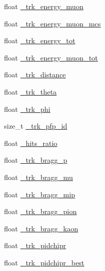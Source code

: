\begin{DoxyCompactItemize}
float \hyperlink{classselection_1_1CC0piNpSelection_aabcb2e3b6df63f077fc37d881c1794a3}{\+\_\+trk\+\_\+energy\+\_\+muon}
\item 
float \hyperlink{classselection_1_1CC0piNpSelection_a4ae8946bcc37ce152c81ba3c28d60fbb}{\+\_\+trk\+\_\+energy\+\_\+muon\+\_\+mcs}
\item 
float \hyperlink{classselection_1_1CC0piNpSelection_a8a0da0081e2f182880249debba6551e3}{\+\_\+trk\+\_\+energy\+\_\+tot}
\item 
float \hyperlink{classselection_1_1CC0piNpSelection_aebac9c09110d469f5d7ed3817c33e437}{\+\_\+trk\+\_\+energy\+\_\+muon\+\_\+tot}
\item 
float \hyperlink{classselection_1_1CC0piNpSelection_a0f16777192fbed04bcc67edfdfa67e6b}{\+\_\+trk\+\_\+distance}
\item 
float \hyperlink{classselection_1_1CC0piNpSelection_a08cd38de74e9611829a3580a310c19f2}{\+\_\+trk\+\_\+theta}
\item 
float \hyperlink{classselection_1_1CC0piNpSelection_a85a6029e249e3ff20ea6d8eaabf22142}{\+\_\+trk\+\_\+phi}
\item 
size\+\_\+t \hyperlink{classselection_1_1CC0piNpSelection_a641e7e656a28a5b31a5c8ab21dad9d3b}{\+\_\+trk\+\_\+pfp\+\_\+id}
\item 
float \hyperlink{classselection_1_1CC0piNpSelection_a32b43003c9168115bc94544049e439a2}{\+\_\+hits\+\_\+ratio}
\item 
float \hyperlink{classselection_1_1CC0piNpSelection_a52d578481ee7dd4fed45f8e3c8ed44da}{\+\_\+trk\+\_\+bragg\+\_\+p}
\item 
float \hyperlink{classselection_1_1CC0piNpSelection_a9e7b081beb0ef9129f15a7fb965276f1}{\+\_\+trk\+\_\+bragg\+\_\+mu}
\item 
float \hyperlink{classselection_1_1CC0piNpSelection_aec1e4d27216773ec40bc66ab5c217abc}{\+\_\+trk\+\_\+bragg\+\_\+mip}
\item 
float \hyperlink{classselection_1_1CC0piNpSelection_a5371981bb5f02024c2ba1d986541ffd9}{\+\_\+trk\+\_\+bragg\+\_\+pion}
\item 
float \hyperlink{classselection_1_1CC0piNpSelection_ac9b23583581239191762cfb60307fb78}{\+\_\+trk\+\_\+bragg\+\_\+kaon}
\item 
float \hyperlink{classselection_1_1CC0piNpSelection_a712eaf6dc6086f1be5705a3bbe5226fc}{\+\_\+trk\+\_\+pidchipr}
\item 
float \hyperlink{classselection_1_1CC0piNpSelection_aaf0a2841494bc52da55d267bc3c8db3d}{\+\_\+trk\+\_\+pidchipr\+\_\+best}
\item 

\end{DoxyCompactItemize}
